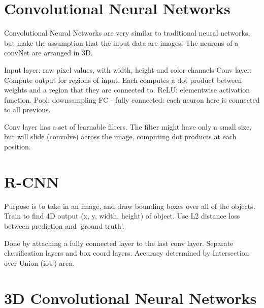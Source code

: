 \documentclass[honours,12pt]{unswthesis}
\numberwithin{equation}{section}
\begin{document}
\section{Convolutional Neural Networks}\label{convNeuralNets}

Convolutional Neural Networks are very similar to traditional neural networks, but make the assumption that the input data are images.
The neurons of a convNet are arranged in 3D. 

Input layer: raw pixel values, with width, height and color channels
Conv layer: Compute output for regions of input. Each computes a dot product between weights and a region that they are connected to.
ReLU: elementwise activation function.
Pool: downsampling
FC - fully connected: each neuron here is connected to all previous.

Conv layer has a set of learnable filters. The filter might have only a small size, but will slide (convolve) across the image, computing dot products at each position.


%
%
%
%


\section{R-CNN}
Purpose is to take in an image, and draw bounding boxes over all of the objects. Train to find 4D output (x, y, width, height) of object. Use L2 distance loss between prediction and 'ground truth'.

Done by attaching a fully connected layer to the last conv layer. Separate classification layers and box coord layers. 
Accuracy determined by Intersection over Union (ioU) area. 




\section{3D Convolutional Neural Networks}\label{3dConvNeuralNets}










\clearpage




\end{document}
